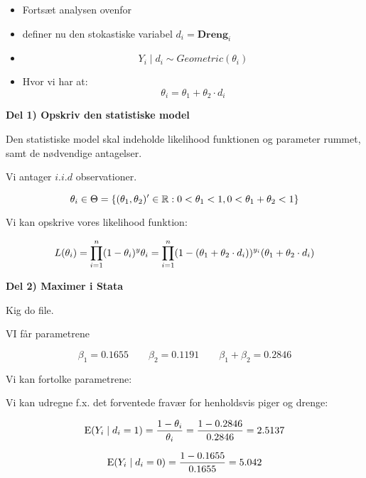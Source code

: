 \begin{itemize}
    \item Fortsæt analysen ovenfor
    \item definer nu den stokastiske variabel $d_i = \textbf{Dreng}_i$
    \item \begin{equation}
        Y_i \mid d_i \sim Geometric(\theta_i)
    \end{equation}
    \item Hvor vi har at:
    \begin{equation}
        \theta_i = \theta_1 + \theta_2 \cdot d_i
    \end{equation}
\end{itemize}

\textbf{Del 1) Opskriv den statistiske model}

Den statistiske model skal indeholde likelihood funktionen og parameter rummet, samt de nødvendige antagelser.

Vi antager $i.i.d$ observationer.

\begin{equation}
    \theta_i \in \Theta = \{(\theta_1, \theta_2)' \in \mathbb{R} : 0 < \theta_1 < 1, 0 < \theta_1 + \theta_2 < 1\}
\end{equation}

Vi kan opskrive vores likelihood funktion:

\begin{equation}
    L(\theta_i ) = \prod_{i=1}^{n} (1- \theta_i)^y \theta_i = \prod_{i=1}^{n} (1 - (\theta_1 + \theta_2 \cdot d_i))^{y_i} (\theta_1 + \theta_2\cdot d_i)
\end{equation}

\textbf{Del 2) Maximer i Stata}

Kig do file.

VI får parametrene

\begin{equation}
    \beta_1 = 0.1655 \qquad \beta_2 = 0.1191 \qquad \beta_1 + \beta_2 = 0.2846
\end{equation}

Vi kan fortolke parametrene:

Vi kan udregne f.x. det forventede fravær for henholdsvis piger og drenge:

\begin{equation}
    \text{E}(Y_i \mid d_i = 1) = \frac{1 - \theta_i}{\theta_i} = \frac{1 - 0.2846}{0.2846} = 2.5137
\end{equation}

\begin{equation}
    \text{E}(Y_i \mid d_i = 0) = \frac{1 - 0.1655}{0.1655} = 5.042
\end{equation}


